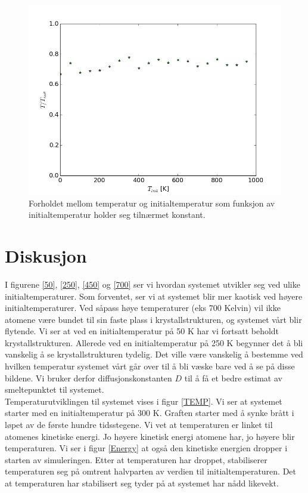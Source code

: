 \documentclass[paper=a4, fontsize=11pt]{scrartcl} %
\numberwithin{equation}{section} %
\numberwithin{figure}{section} %
\numberwithin{table}{section} %
\begin{document}
\FloatBarrier
\begin{figure}[!ht]
 \centering
 \includegraphics[scale=0.5]{T_ratio.png}
 \caption{Forholdet mellom temperatur og initialtemperatur som funksjon av initialtemperatur holder seg tilnærmet konstant.}
 \label{Trat}
 \end{figure}
 \FloatBarrier

\section{Diskusjon}
I figurene \ref{50}, \ref{250}, \ref{450} og \ref{700} ser vi hvordan systemet utvikler seg ved ulike initialtemperaturer. Som forventet, ser vi at  systemet blir mer kaotisk ved høyere initialtemperaturer. Ved såpass høye temperaturer (eks 700 Kelvin) vil ikke atomene være bundet til sin faste plass i krystallstrukturen, og systemet vårt blir flytende. Vi ser at ved en initialtemperatur på 50 K har vi fortsatt beholdt krystallstrukturen. Allerede ved en initialtemperatur på 250 K begynner det å bli vanskelig å se krystallstrukturen tydelig. Det ville være vanskelig å bestemme ved hvilken temperatur systemet vårt går over til å bli væske bare ved å se på disse bildene. Vi bruker derfor diffusjonskonstanten $D$ til å få et bedre estimat av smeltepunktet til systemet. \\

Temperaturutviklingen til systemet vises i figur \ref{TEMP}. Vi ser at systemet starter med en initialtemperatur på 300 K.  Graften starter med å synke brått i løpet av de første hundre tidsstegene. Vi vet at temperaturen er linket til atomenes kinetiske energi. Jo høyere kinetisk energi atomene har, jo høyere blir temperaturen. Vi ser i figur \ref{Energy} at også den kinetiske energien dropper i starten av simuleringen. Etter at temperaturen har droppet, stabiliserer temperaturen seg på omtrent halvparten av verdien til  initialtemperaturen. Det at temperaturen har stabilisert seg tyder på at systemet har nådd likevekt.\\
\end{document}
